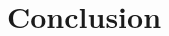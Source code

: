 \documentclass[conference]{IEEEtran}
\begin{document}
\section{Conclusion}




%
%
%
\begin{thebibliography}{1}


\end{thebibliography}
\end{document}
